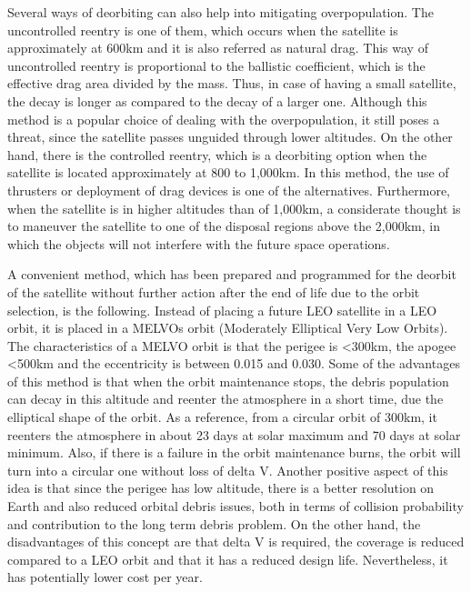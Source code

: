 Several ways of deorbiting can also help into mitigating overpopulation. The uncontrolled reentry is one of them, which occurs when the satellite is approximately at 600km and it is also referred as natural drag. This way of uncontrolled reentry is proportional to the ballistic coefficient, which is the effective drag area divided by the mass. Thus, in case of having a small satellite, the decay is longer as compared to the decay of a larger one. Although this method is a popular choice of dealing with the overpopulation, it still poses a threat, since the satellite passes unguided through lower altitudes. On the other hand, there is the controlled reentry, which is a deorbiting option when the satellite is located approximately at 800 to 1,000km. In this method, the use of thrusters or deployment of drag devices is one of the alternatives. Furthermore, when the satellite is in higher altitudes than of 1,000km, a considerate thought is to maneuver the satellite to one of the disposal regions above the 2,000km, in which the objects will not interfere with the future space operations. \cite{NASA}


\bigskip
A convenient method, which has been prepared and programmed for the deorbit of the satellite without further action after the end of life due to the orbit selection, is the following. Instead of placing a future LEO satellite in a LEO orbit, it is placed in a MELVOs orbit (Moderately Elliptical Very Low Orbits). The characteristics of a MELVO orbit is that the perigee is <300km, the apogee <500km and the eccentricity is between 0.015 and 0.030. Some of the advantages of this method is that when the orbit maintenance stops, the debris population can decay in this altitude and reenter the atmosphere in a short time, due the elliptical shape of the orbit. As a reference, from a circular orbit of 300km, it reenters the atmosphere in about 23 days at solar maximum and 70 days at solar minimum. Also, if there is a failure in the orbit maintenance burns, the orbit will turn into a circular one without loss of delta V. Another positive aspect of this idea is that since the perigee has low altitude, there is a better resolution on Earth and also reduced orbital debris issues, both in terms of collision probability and contribution to the long term debris problem. \cite{Kramer 2002} On the other hand, the disadvantages of this concept are that delta V is required, the coverage is reduced compared to a LEO orbit and that it has a reduced design life. Nevertheless, it has potentially lower cost per year.

